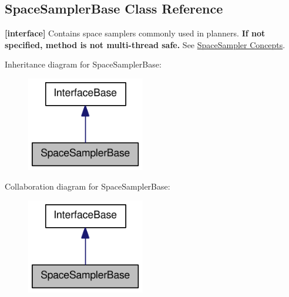\hypertarget{classOpenRAVE_1_1SpaceSamplerBase}{
\subsection{SpaceSamplerBase Class Reference}
\label{classOpenRAVE_1_1SpaceSamplerBase}
}


{\bfseries \mbox{[}interface\mbox{]}} Contains space samplers commonly used in planners. {\bfseries If not specified, method is not multi-\/thread safe.} See \hyperlink{arch__spacesampler}{SpaceSampler Concepts}.  




Inheritance diagram for SpaceSamplerBase:\nopagebreak
\begin{figure}[H]
\begin{center}
\leavevmode
\includegraphics[width=146pt]{classOpenRAVE_1_1SpaceSamplerBase__inherit__graph}
\end{center}
\end{figure}


Collaboration diagram for SpaceSamplerBase:\nopagebreak
\begin{figure}[H]
\begin{center}
\leavevmode
\includegraphics[width=146pt]{classOpenRAVE_1_1SpaceSamplerBase__coll__graph}
\end{center}
\end{figure}
